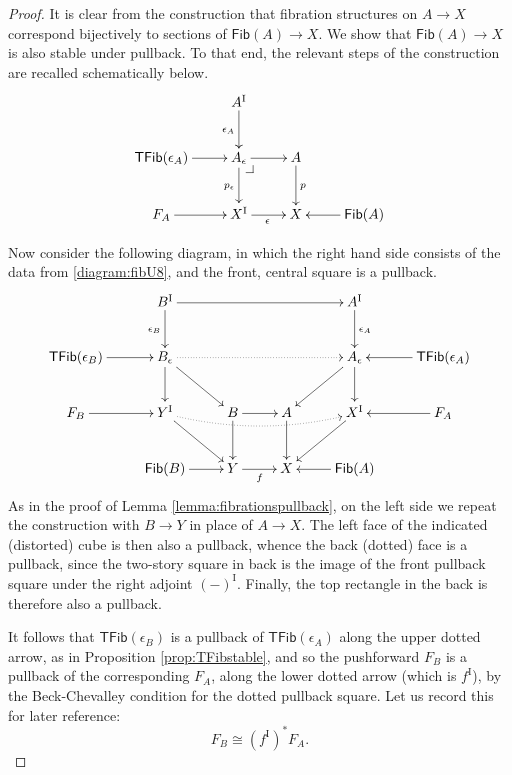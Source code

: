\documentclass[11pt,reqno]{amsart}
\makeatletter
\newcommand{\ra}{\ensuremath{\rightarrow}}
\newcommand{\I}{\ensuremath{\mathrm{I}}}
\newcommand{\Fib}{\ensuremath{\mathsf{Fib}}}
\newcommand{\TFib}{\ensuremath{\mathsf{TFib}}}
\theoremstyle{remark}
\theoremstyle{definition}
\newcommand{\pbcorner}[1][dr]{\save*!/#1-1.2pc/#1:(-1,1)@^{|-}\restore}
\makeatother
\begin{document}
\begin{proof}
It is clear from the construction that fibration structures on $A\ra X$ correspond bijectively to sections of $\Fib(A)\ra X$. We show that $\Fib(A)\ra X$ is also stable under pullback.  To that end, the relevant steps of the construction are recalled schematically below.
\begin{equation}\label{diagram:fibU8}
\xymatrix{
&A^\I \ar[d]_{\epsilon_A} & &\\
\TFib(\epsilon_A) \ar[r] & A_\epsilon\ar[d]_{p_\epsilon} \ar[r] \pbcorner & A \ar[d]^{p} &\\
F_A \ar[r] & X^\I \ar[r]_{\epsilon} &  X & \ar[l] \Fib(A)
}
\end{equation}

Now consider the following diagram, in which the right hand side consists  of the data from  \eqref{diagram:fibU8}, and the front, central square is a pullback.
\begin{equation}\label{diagram:fibU9}
\xymatrix{
 & B^\I \ar[rrr] \ar[d]_{\epsilon_B} &&& A^\I \ar[d]^{\epsilon_A} &\\
 \TFib(\epsilon_B) \ar[r] & B_\epsilon \ar[d] \ar[rd] \ar@{.>}[rrr] &&& A_\epsilon \ar[d] \ar[ld] &  \TFib(\epsilon_A) \ar[l] \\
 F_B  \ar[r] & Y^\I \ar[rd] \ar@{.>}@/_.75pc/[rrr] & B \ar[r] \ar[d] & A \ar[d] &  X^\I \ar[ld]  & \ar[l] F_A \\
 &\Fib(B) \ar[r] & Y \ar[r]_f & X &\Fib(A) \ar[l] &
 }
\end{equation}
As in the proof of Lemma \ref{lemma:fibrationspullback}, on the left side we repeat the construction with $B \ra Y$ in place of $A\ra X$.  The left face of the indicated (distorted) cube is then also a pullback, whence the back (dotted) face is a pullback, since the two-story square in back is the image of the front pullback square under the right adjoint $(-)^\I$. Finally, the top rectangle in the back is therefore also a pullback.
 
It follows that $\TFib(\epsilon_B)$ is a pullback of $\TFib(\epsilon_A)$ along the upper dotted arrow, as in Proposition \ref{prop:TFibstable}, and so the pushforward $F_B$ is a pullback of the corresponding $F_A$, along the lower dotted arrow (which is $f^\I$), by the Beck-Chevalley condition for the dotted pullback square.  Let us record this for later reference:
\begin{equation}\label{eq:pbFB}
F_B \cong (f^\I)^*F_A.
\end{equation}


\end{proof}
\end{document}
